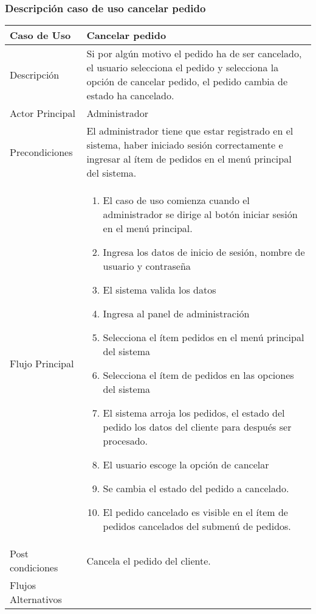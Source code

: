 \documentclass[12pt,a4paper]{article}
\begin{document}
    \newpage
\subsubsection*{Descripción caso de uso cancelar pedido}
\begin{table}[h]
        \centering
        \begin{tabular}{| p{3cm}| p{11cm} |} 
        \hline  
        Caso de Uso         &    \textbf{Cancelar pedido }   \\ 
        \hline
        Descripción         &   Si por algún motivo el pedido ha de ser cancelado, el usuario selecciona el pedido y selecciona la opción de cancelar pedido, el pedido cambia de estado ha cancelado.    \\ 
        \hline
        Actor Principal     &   Administrador   \\ 
        \hline
        Precondiciones      &   El administrador tiene que estar registrado en el sistema, haber iniciado sesión correctamente e ingresar al ítem de pedidos en el menú principal del sistema.  	\\
        \hline
        Flujo Principal     &    

            \begin{enumerate}
                \item El caso de uso comienza cuando el administrador se dirige al botón iniciar sesión en el menú principal.
                \item Ingresa los datos de inicio de sesión, nombre de usuario y contraseña
                \item El sistema valida los datos
                \item Ingresa al panel de administración
                \item Selecciona el ítem pedidos en el menú principal del sistema
                \item Selecciona el ítem de pedidos en las opciones del sistema
                \item El sistema arroja los pedidos, el estado del pedido los datos del cliente para después ser procesado.
                \item El usuario escoge la opción de cancelar
                \item Se cambia el estado del pedido a cancelado.
                \item El pedido cancelado es visible en el ítem de pedidos cancelados del submenú de pedidos.
            \end{enumerate}
        \\  
        \hline
        Post condiciones    &   Cancela el pedido del cliente.    \\  
        \hline
        Flujos Alternativos &       \\  
        \hline
        \end{tabular}
    \end{table}
\end{document}
